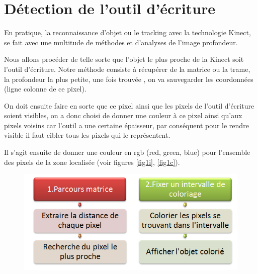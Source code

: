 \documentclass[12pt,a4paper,oneside]{book}
\begin{document}
	\section{Détection de l'outil d'écriture}
	En pratique, la reconnaissance d'objet ou le tracking avec la technologie Kinect, se fait avec une multitude de méthodes et d'analyses de l'image profondeur.
	
	Nous allons procéder de telle sorte que l'objet le plus proche de la Kinect soit l'outil d'écriture.
	Notre méthode consiste à récupérer de la matrice ou la trame, la profondeur la plus petite,  une fois  trouvée , on va sauvegarder les coordonnées (ligne colonne de ce pixel).
	
	On doit ensuite faire en sorte que ce pixel ainsi que les pixels de l'outil d'écriture soient visibles, on a donc choisi de donner une couleur à ce pixel ainsi qu'aux pixels voisins car l'outil a une certaine épaisseur, par conséquent pour le rendre visible il faut cibler tous les pixels qui le représentent.
	
	Il s'agit ensuite de donner une couleur en rgb (red, green, blue) pour l'ensemble des pixels de la zone localisée (voir figures \ref{fig1i}, \ref{fig1c}).
	
	\begin{figure}[H]
		\centering
		\includegraphics[scale=0.75]{images/s2.png}
		
		\label{fig}
	\end{figure}
	
\end{document}

